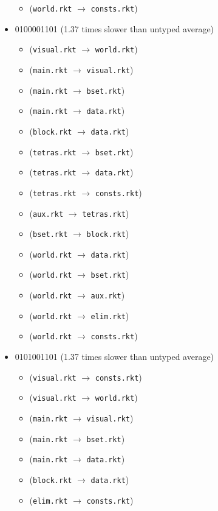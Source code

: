 \documentclass{article}
\newcommand{\mono}[1]{\texttt{#1}}
\begin{document}
\begin{itemize}
\begin{itemize}
  \item (\mono{world.rkt} $\rightarrow$ \mono{consts.rkt})
  \end{itemize}
\item 0100001101 (1.37 times slower than untyped average)
  \begin{itemize}
  \item (\mono{visual.rkt} $\rightarrow$ \mono{world.rkt})
  \item (\mono{main.rkt} $\rightarrow$ \mono{visual.rkt})
  \item (\mono{main.rkt} $\rightarrow$ \mono{bset.rkt})
  \item (\mono{main.rkt} $\rightarrow$ \mono{data.rkt})
  \item (\mono{block.rkt} $\rightarrow$ \mono{data.rkt})
  \item (\mono{tetras.rkt} $\rightarrow$ \mono{bset.rkt})
  \item (\mono{tetras.rkt} $\rightarrow$ \mono{data.rkt})
  \item (\mono{tetras.rkt} $\rightarrow$ \mono{consts.rkt})
  \item (\mono{aux.rkt} $\rightarrow$ \mono{tetras.rkt})
  \item (\mono{bset.rkt} $\rightarrow$ \mono{block.rkt})
  \item (\mono{world.rkt} $\rightarrow$ \mono{data.rkt})
  \item (\mono{world.rkt} $\rightarrow$ \mono{bset.rkt})
  \item (\mono{world.rkt} $\rightarrow$ \mono{aux.rkt})
  \item (\mono{world.rkt} $\rightarrow$ \mono{elim.rkt})
  \item (\mono{world.rkt} $\rightarrow$ \mono{consts.rkt})
  \end{itemize}
\item 0101001101 (1.37 times slower than untyped average)
  \begin{itemize}
  \item (\mono{visual.rkt} $\rightarrow$ \mono{consts.rkt})
  \item (\mono{visual.rkt} $\rightarrow$ \mono{world.rkt})
  \item (\mono{main.rkt} $\rightarrow$ \mono{visual.rkt})
  \item (\mono{main.rkt} $\rightarrow$ \mono{bset.rkt})
  \item (\mono{main.rkt} $\rightarrow$ \mono{data.rkt})
  \item (\mono{block.rkt} $\rightarrow$ \mono{data.rkt})
  \item (\mono{elim.rkt} $\rightarrow$ \mono{consts.rkt})

\end{itemize}
\end{itemize}
\end{document}
